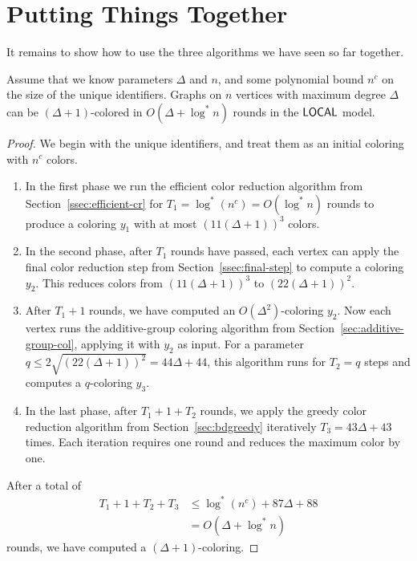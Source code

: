 \section{Putting Things Together}

It remains to show how to use the three algorithms we have seen so far together.

\begin{theorem}
  Assume that we know parameters $\Delta$ and $n$, and some polynomial bound $n^c$ on the size of the unique identifiers. Graphs on $n$ vertices with maximum degree $\Delta$ can be $(\Delta+1)$-colored in $O(\Delta + \log^* n)$ rounds in the $\textup{\sffamily LOCAL}$ model.
\end{theorem}

\begin{proof}
  We begin with the unique identifiers, and treat them as an initial coloring with $n^c$ colors. 
  \begin{enumerate}
    \item In the first phase we run the efficient color reduction algorithm from Section~\ref{ssec:efficient-cr} for $T_1 = \log^* (n^c) = O(\log^* n)$ rounds to produce a coloring $y_1$ with at most $(11(\Delta+1))^3$ colors.
    \item In the second phase, after $T_1$ rounds have passed, each vertex can apply the final color reduction step from Section~\ref{ssec:final-step} to compute a coloring $y_2$. This reduces colors from $(11(\Delta+1))^3$ to $(22(\Delta+1))^2$.
    \item After $T_1 + 1$ rounds, we have computed an $O(\Delta^2)$-coloring $y_2$. Now each vertex runs the additive-group coloring algorithm from Section~\ref{sec:additive-group-col}, applying it with $y_2$ as input. For a parameter $q \leq 2\sqrt{(22(\Delta+1))^2} = 44\Delta+44$, this algorithm runs for $T_2 = q$ steps and computes a $q$-coloring $y_3$.
    \item In the last phase, after $T_1 + 1 + T_2$ rounds, we apply the greedy color reduction algorithm from Section~\ref{sec:bdgreedy} iteratively $T_3 = 43\Delta+43$ times. Each iteration requires one round and reduces the maximum color by one.
  \end{enumerate}
  After a total of
  \begin{align*}
      T_1 + 1 + T_2 + T_3 &\leq \log^* (n^c) + 87\Delta + 88 \\
      &= O(\Delta + \log^* n)
  \end{align*}
  rounds, we have computed a $(\Delta+1)$-coloring.
\end{proof}


